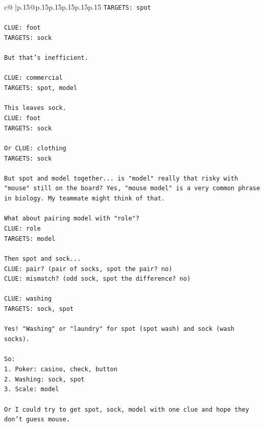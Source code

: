 \documentclass{article}
\begin{document}
{\begin{supertabular}{c@{$\;$}|p{.15\linewidth}@{}p{.15\linewidth}p{.15\linewidth}p{.15\linewidth}p{.15\linewidth}p{.15\linewidth}}
{{{\texttt{TARGETS: spot} \\
\\ 
\texttt{CLUE: foot} \\
\texttt{TARGETS: sock} \\
\\ 
\texttt{But that's inefficient.} \\
\\ 
\texttt{CLUE: commercial} \\
\texttt{TARGETS: spot, model} \\
\\ 
\texttt{This leaves sock.} \\
\texttt{CLUE: foot} \\
\texttt{TARGETS: sock} \\
\\ 
\texttt{Or CLUE: clothing} \\
\texttt{TARGETS: sock} \\
\\ 
\texttt{But spot and model together... is "model" really that risky with "mouse" still on the board? Yes, "mouse model" is a very common phrase in biology. My teammate might think of that.} \\
\\ 
\texttt{What about pairing model with "role"?} \\
\texttt{CLUE: role} \\
\texttt{TARGETS: model} \\
\\ 
\texttt{Then spot and sock...} \\
\texttt{CLUE: pair? (pair of socks, spot the pair? no)} \\
\texttt{CLUE: mismatch? (odd sock, spot the difference? no)} \\
\\ 
\texttt{CLUE: washing} \\
\texttt{TARGETS: sock, spot} \\
\\ 
\texttt{Yes! "Washing" or "laundry" for spot (spot wash) and sock (wash socks).} \\
\\ 
\texttt{So:} \\
\texttt{1. Poker: casino, check, button} \\
\texttt{2. Washing: sock, spot} \\
\texttt{3. Scale: model} \\
\\ 
\texttt{Or I could try to get spot, sock, model with one clue and hope they don't guess mouse.} \\
}}}
\end{supertabular}}
\end{document}
